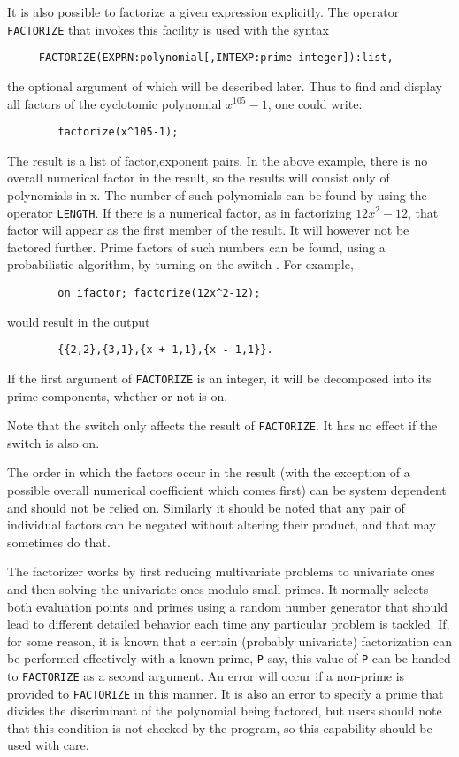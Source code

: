 \hypertarget{operator:FACTORIZE}{}
It is also possible to factorize a given expression explicitly.  The
operator \texttt{FACTORIZE} that invokes this facility is
used with the syntax
\begin{verbatim}
     FACTORIZE(EXPRN:polynomial[,INTEXP:prime integer]):list,
\end{verbatim}
the optional argument of which will be described later. Thus to find and
display all factors of the cyclotomic polynomial $x^{105}-1$, one could
write:
\begin{verbatim}
        factorize(x^105-1);
\end{verbatim}
The result is a list of factor,exponent pairs.
In the above example, there is no overall numerical factor in the result,
so the results will consist only of polynomials in x.  The number of such
polynomials can be found by using the operator \texttt{LENGTH}.
If there is a numerical factor, as in factorizing $12x^{2}-12$,
that factor will appear as the first member of the result.
It will however not be factored further.  Prime factors of such numbers
can be found, using a probabilistic algorithm, by turning on the switch
.  For example,
\begin{verbatim}
        on ifactor; factorize(12x^2-12);
\end{verbatim}
would result in the output
\begin{verbatim}
        {{2,2},{3,1},{x + 1,1},{x - 1,1}}.
\end{verbatim}

If the first argument of \texttt{FACTORIZE} is an integer, it will be
decomposed into its prime components, whether or not  is on.

Note that the  switch only affects the result of \texttt{FACTORIZE}.
It has no effect if the  switch is also on.

The order in which the factors occur in the result (with the exception of
a possible overall numerical coefficient which comes first) can be system
dependent and should not be relied on. Similarly it should be noted that
any pair of individual factors can be negated without altering their
product, and that {\REDUCE} may sometimes do that.

The factorizer works by first reducing multivariate problems to univariate
ones and then solving the univariate ones modulo small primes. It normally
selects both evaluation points and primes using a random number generator
that should lead to different detailed behavior each time any particular
problem is tackled. If, for some reason, it is known that a certain
(probably univariate) factorization can be performed effectively with a
known prime, \texttt{P} say, this value of \texttt{P} can be handed to
\texttt{FACTORIZE} as a second
argument. An error will occur if a non-prime is provided to \texttt{FACTORIZE} in
this manner. It is also an error to specify a prime that divides the
discriminant of the polynomial being factored, but users should note that
this condition is not checked by the program, so this capability should be
used with care.

